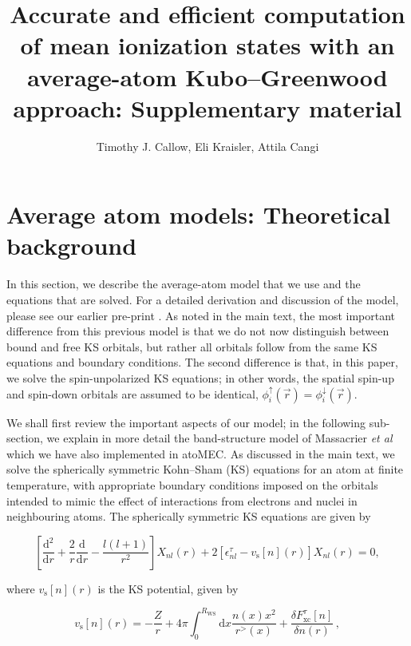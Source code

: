 \documentclass[9pt]{article}
\title{Accurate and efficient computation of mean ionization states with an average-atom Kubo--Greenwood approach: Supplementary material}
\author{Timothy J. Callow, Eli Kraisler, Attila Cangi}
\begin{document}
    
    \maketitle
    
    

    
    \hypertarget{average-atom-models-theoretical-background}{%
\section{Average atom models: Theoretical
background}\label{average-atom-models-theoretical-background}}

In this section, we describe the average-atom model that we use and the
equations that are solved. For a detailed derivation and discussion of
the model, please see our earlier pre-print
\cite{callow2021firstprinciples}. As noted in the main text, the most
important difference from this previous model is that we do not now
distinguish between bound and free KS orbitals, but rather all orbitals
follow from the same KS equations and boundary conditions. The second
difference is that, in this paper, we solve the spin-unpolarized KS
equations; in other words, the spatial spin-up and spin-down orbitals
are assumed to be identical,
\(\phi_i^\uparrow(\vec{r})=\phi_i^\downarrow(\vec{r})\).

We shall first review the important aspects of our model; in the
following sub-section, we explain in more detail the band-structure
model of Massacrier \emph{et al} \cite{massacrier_band} which we have
also implemented in atoMEC. As discussed in the main text, we solve the
spherically symmetric Kohn--Sham (KS) equations for an atom at finite
temperature, with appropriate boundary conditions imposed on the
orbitals intended to mimic the effect of interactions from electrons and
nuclei in neighbouring atoms. The spherically symmetric KS equations are
given by

\begin{equation}
\left[\frac{\textrm{d}^2}{\textrm{d}r} + \frac{2}{r}\frac{\textrm{d}}{\textrm{d}r} - \frac{l(l+1)}{r^2} \right] X_{nl}(r) + 2 \left[\epsilon^{\tau}_{nl} - v_\textrm{s}[n](r) \right] X_{nl}(r) = 0,
\end{equation}

where \(v_\textrm{s}[n](r)\) is the KS potential, given by

\begin{equation}
 v_{\textrm{s}}[n](r) = -\frac{Z}{r} + 4\pi \int_0^{R_\textrm{WS}} \textrm{d}{x} \frac{n(x)x^2}{r^>(x)} + \frac{\delta F_\textrm{xc}^\tau [n]}{\delta n(r)}\,,
\end{equation}
\end{document}
